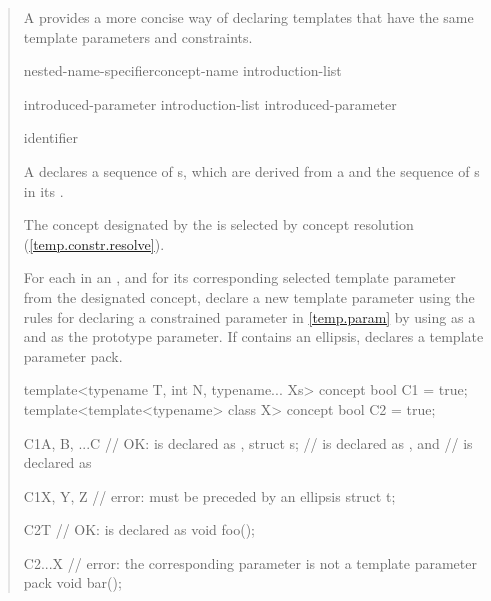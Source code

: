 \begin{quote}

\pnum
A  provides a more concise way of declaring
templates that have the same template parameters and constraints.

\begin{bnf}
\br
  nested-name-specifier\opt concept-name \terminal{\{} introduction-list \terminal{\}}

\br
  introduced-parameter\br
  introduction-list \terminal{,} introduced-parameter

\br
    \opt identifier
\end{bnf}

A  declares a sequence of 
s, which are derived from a 
 and the sequence of s in
its .

\pnum
The concept designated by the  is selected by 
concept resolution (\ref{temp.constr.resolve}).

\pnum
For each   in an
, and for its corresponding selected template 
parameter  from the designated concept, declare a new template
parameter using the rules for declaring a constrained parameter in
\ref{temp.param} by using  as a  and 
 as the prototype parameter.
% 
% 
If  contains an ellipsis,  declares a template 
parameter pack.
% 
\enterexample
\begin{codeblock}
template<typename T, int N, typename... Xs> concept bool C1 = true;
template<template<typename> class X> concept bool C2 = true;

C1{A, B, ...C} // OK:  is declared as ,
  struct s;    //  is declared as , and
               //  is declared as 

C1{X, Y, Z} // error:  must be preceded by an ellipsis
  struct t;

C2{T} // OK:  is declared as 
  void foo();

C2{...X} // error: the corresponding parameter is not a template parameter pack
  void bar();
\end{codeblock}
\exitexample



\end{quote}
